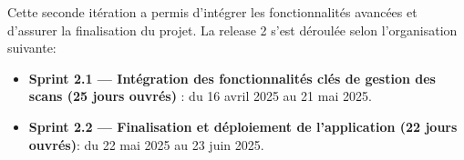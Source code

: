 Cette seconde itération a permis d'intégrer les fonctionnalités avancées et d'assurer la finalisation du projet. La release 2 s'est déroulée selon l'organisation suivante:
\begin{itemize}[label=$\bullet$]
    \item \textbf{Sprint 2.1 — Intégration des fonctionnalités clés de gestion des scans (25 jours ouvrés)} : du 16 avril 2025 au 21 mai 2025.
    \item \textbf{Sprint 2.2 — Finalisation et déploiement de l’application (22 jours ouvrés)}: du 22 mai 2025 au 23 juin 2025.
\end{itemize}